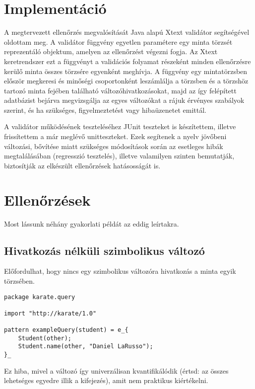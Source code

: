 
\section{Implementáció}

A megtervezett ellenőrzés megvalósítását Java alapú Xtext validátor segítségével oldottam meg.
A validátor függvény egyetlen paramétere egy minta törzsét reprezentáló objektum, amelyen az ellenőrzést végezni fogja.
Az Xtext keretrendszer ezt a függvényt a validációs folyamat részeként minden ellenőrzésre kerülő minta összes törzsére egyenként meghívja.
A függvény egy mintatörzsben először megkeresi és minőségi csoportonként leszámlálja a törzsben és a törzshöz tartozó minta fejében található változóhivatkozásokat, majd az így felépített adatbázist bejárva megvizsgálja az egyes változókat a rájuk érvényes szabályok szerint, és ha szükséges, figyelmeztetést vagy hibaüzenetet emittál.

A validátor működésének teszteléséhez JUnit teszteket is készítettem, illetve frissítettem a már meglévő unitteszteket. Ezek segítenek a nyelv jövőbeni változási, bővítése miatt szükséges módosítások során az esetleges hibák megtalálásában (regresszió tesztelés), illetve valamilyen szinten bemutatják, biztosítják az elkészült ellenőrzések hatásosságát is.


\section{Ellenőrzések}

Most lássunk néhány gyakorlati példát az eddig leírtakra.

\subsection{Hivatkozás nélküli szimbolikus változó}

Előfordulhat, hogy nincs egy szimbolikus változóra hivatkozás a minta egyik törzsében.

\begin{lstlisting}
package karate.query

import "http://karate/1.0"

pattern exampleQuery(student) = e_{
    Student(other);
    Student.name(other, "Daniel LaRusso");
}_
\end{lstlisting}
%
Ez hiba, mivel a változó így univerzálisan kvantifikálódik (értsd: az összes lehetséges egyedre illik a kifejezés), amit nem praktikus kiértékelni.

